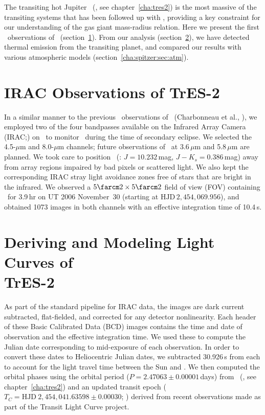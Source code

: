 The transiting hot Jupiter \tresTwo\ (\citealp{ODonovan_Charbonneau_Mandushev:apjl:2006a}, see chapter~\ref{cha:tres2}) is the most massive of the transiting systems that has been followed up with \spi, providing a key constraint for our understanding of the gas giant mass-radius relation.
Here we present the first \spi\ observations of \tresTwo\ (section~\ref{cha:spitzer:sec:obs}).
From our analysis (section~\ref{cha:spitzer:sec:lc}), we have detected thermal emission from the transiting planet, and compared our results with various atmospheric models (section~\ref{cha:spitzer:sec:atm}).

\section{IRAC Observations of TrES-2}\label{cha:spitzer:sec:obs}

In a similar manner to the previous \spi\ observations of \tresOne\ (Charbonneau et al., \citeyear{Charbonneau_Allen_Megeath:apj:2005a}), we employed two of the four bandpasses available on the Infrared Array Camera (IRAC;\@\citealt{Fazio_Hora_Allen:apjs:2004a}) on \spi\ to monitor \tresTwo\ during the time of secondary eclipse.
We selected the 4.5-$\mu$m and 8.0-$\mu$m channels; future observations of \tresTwo\ at 3.6\,$\mu$m and 5.8\,$\mu$m are planned.
We took care to position \tresTwo\ (\tresTwoTwoMass: \mbox{$J=10.232$\,mag}, \mbox{$J-K_{s}=0.386$\,mag}) away from array regions impaired by bad pixels or scattered light.
We also kept the corresponding IRAC stray light avoidance zones free of stars that are bright in the infrared.
We observed a \mbox{$5\farcm2 \times 5\farcm2$} field of view (FOV) containing \tresTwo\ for 3.9\,hr on UT 2006 November~30 (starting at \mbox{$\mathrm{HJD}\,2,\!454,\!069.956$}), and obtained 1073 images in both channels with an effective integration time of 10.4\,s.

\section[Deriving and Modeling Light Curves of TrES-2]{Deriving and Modeling Light Curves of \\ TrES-2}\label{cha:spitzer:sec:lc}

As part of the standard pipeline for IRAC data, the images are dark current subtracted, flat-fielded, and corrected for any detector nonlinearity.
Each header of these Basic Calibrated Data (BCD) images contains the time and date of observation and the effective integration time.
We used these to compute the Julian date corresponding to mid-exposure of each observation.
In order to convert these dates to Heliocentric Julian dates, we subtracted 30.926\,s from each to account for the light travel time between the Sun and \spi.
We then computed the orbital phases using the orbital period (\mbox{$P=2.47063\pm0.00001$\,days}) from \citeauthor{ODonovan_Charbonneau_Mandushev:apjl:2006a}~(\citeyear{ODonovan_Charbonneau_Mandushev:apjl:2006a}, see chapter~\ref{cha:tres2}) and an updated transit epoch (\mbox{$T_{C} = \mathrm{HJD}~2,\!454,\!041.63598\pm0.00030$}; \citealt{Holman_Winn_Latham:apj:2007a}) derived from recent observations made as part of the Transit Light Curve project.

